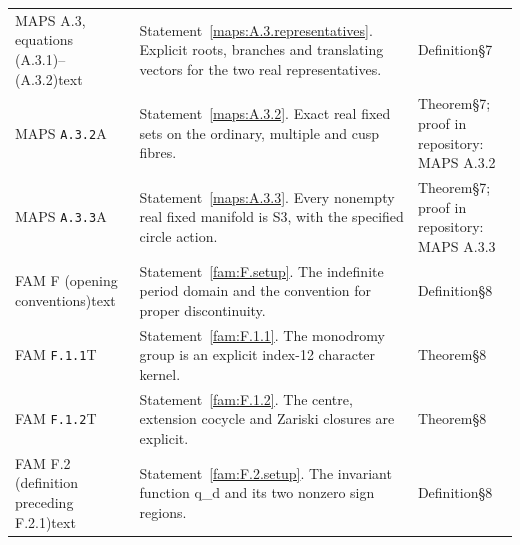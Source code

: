 \documentclass[11pt,a4paper]{article}
\theoremstyle{plain}
\theoremstyle{definition}
\begin{document}
\begin{longtable}{@{}L{.18\linewidth}L{.48\linewidth}L{.29\linewidth}@{}}
MAPS A.3, equations (A.3.1)--(A.3.2)\newline text & Statement~\ref{maps:A.3.representatives}. Explicit roots, branches and translating vectors for the two real representatives.\newline {} & Definition\newline §7\\
MAPS \nolinkurl{A.3.2}\newline A & Statement~\ref{maps:A.3.2}. Exact real fixed sets on the ordinary, multiple and cusp fibres.\newline {} & Theorem\newline §7; proof in repository:\allowbreak{} MAPS A.3.2\\
MAPS \nolinkurl{A.3.3}\newline A & Statement~\ref{maps:A.3.3}. Every nonempty real fixed manifold is S3, with the specified circle action.\newline {} & Theorem\newline §7; proof in repository:\allowbreak{} MAPS A.3.3\\
FAM F (opening conventions)\newline text & Statement~\ref{fam:F.setup}. The indefinite period domain and the convention for proper discontinuity.\newline {} & Definition\newline §8\\
FAM \nolinkurl{F.1.1}\newline T & Statement~\ref{fam:F.1.1}. The monodromy group is an explicit index-12 character kernel.\newline {} & Theorem\newline §8\\
FAM \nolinkurl{F.1.2}\newline T & Statement~\ref{fam:F.1.2}. The centre, extension cocycle and Zariski closures are explicit.\newline {} & Theorem\newline §8\\
FAM F.2 (definition preceding F.2.1)\newline text & Statement~\ref{fam:F.2.setup}. The invariant function q\_\allowbreak{}d and its two nonzero sign regions.\newline {} & Definition\newline §8\\

\end{longtable}
\end{document}
